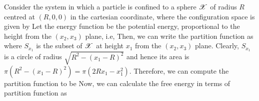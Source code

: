 \documentclass[letterpaper,english,10pt]{article}
\begin{document}
\begin{shaded*}
\begin{exmp}
Consider the system in which a particle is confined to a sphere $\mathscr{X}$ of radius $R$ centred at $(R,0,0)$ in the cartesian coordinate, 
where the configuration space is given by
Let the energy function be the potential energy, proportional to the height from the $(x_2, x_3)$ plane, i.e,
Then, we can write the partition function as
where $S_{x_1}$ is the subset of $\mathscr{X}$ at height $x_1$ from the $(x_2, x_3)$ plane. 
Clearly, $S_{x_1}$ is a circle of radius $\sqrt{R^2 - (x_1-R)^2}$ and hence its area is $ \pi (R^2 - (x_1-R)^2) = \pi(2Rx_1 - x_1^2)$. 
Therefore, we can compute the partition function to be
Now, we can calculate the free energy in terms of partition function as 
\end{exmp}
\end{shaded*}
\end{document}
